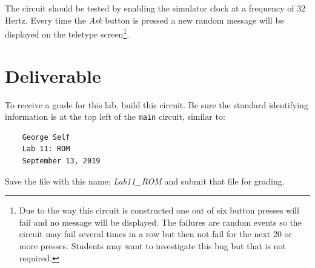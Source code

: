 The circuit should be tested by enabling the simulator clock at a frequency of 32 Hertz. Every time the \textit{Ask} button is pressed a new random message will be displayed on the teletype screen\footnote{Due to the way this circuit is constructed one out of six button presses will fail and no message will be displayed. The failures are random events so the circuit may fail several times in a row but then not fail for the next 20 or more presses. Students may want to investigate this bug but that is not required.}.

\section{Deliverable}

To receive a grade for this lab, build this circuit. Be sure the standard identifying information is at the top left of the \lstinline{main} circuit, similar to: 

\bigskip
\begin{minipage}{\linewidth}
	\begin{verbatim}
	George Self
	Lab 11: ROM
	September 13, 2019
	\end{verbatim}
\end{minipage}
\bigskip

Save the file with this name: \textit{Lab11\_ROM} and submit that file for grading.


